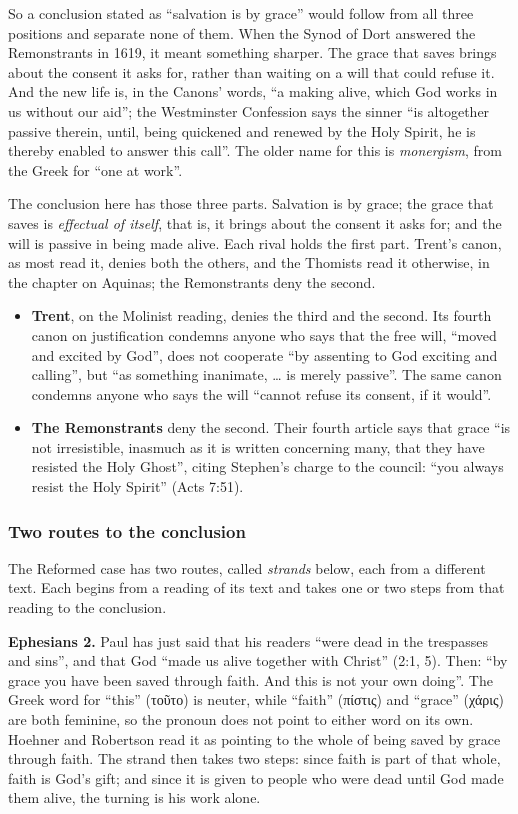 \documentclass[11pt]{article}
\begin{document}
So a conclusion stated as “salvation is by grace” would follow from all three positions and separate none of them. When the Synod of Dort answered the Remonstrants in 1619, it meant something sharper. The grace that saves brings about the consent it asks for, rather than waiting on a will that could refuse it. And the new life is, in the Canons’ words, “a making alive, which God works in us without our aid”; the Westminster Confession says the sinner “is altogether passive therein, until, being quickened and renewed by the Holy Spirit, he is thereby enabled to answer this call”. The older name for this is \emph{monergism}, from the Greek for “one at work”.

The conclusion here has those three parts. Salvation is by grace; the grace that saves is \emph{effectual of itself}, that is, it brings about the consent it asks for; and the will is passive in being made alive. Each rival holds the first part. Trent’s canon, as most read it, denies both the others, and the Thomists read it otherwise, in the chapter on Aquinas; the Remonstrants deny the second.

\begin{itemize}
  \item \textbf{Trent}, on the Molinist reading, denies the third and the second. Its fourth canon on justification condemns anyone who says that the free will, “moved and excited by God”, does not cooperate “by assenting to God exciting and calling”, but “as something inanimate, … is merely passive”. The same canon condemns anyone who says the will “cannot refuse its consent, if it would”.
  \item \textbf{The Remonstrants} deny the second. Their fourth article says that grace “is not irresistible, inasmuch as it is written concerning many, that they have resisted the Holy Ghost”, citing Stephen’s charge to the council: “you always resist the Holy Spirit” (Acts 7:51).
\end{itemize}
\subsubsection*{Two routes to the conclusion}
The Reformed case has two routes, called \emph{strands} below, each from a different text. Each begins from a reading of its text and takes one or two steps from that reading to the conclusion.

\textbf{Ephesians 2.} Paul has just said that his readers “were dead in the trespasses and sins”, and that God “made us alive together with Christ” (2:1, 5). Then: “by grace you have been saved through faith. And this is not your own doing”. The Greek word for “this” (τοῦτο) is neuter, while “faith” (πίστις) and “grace” (χάρις) are both feminine, so the pronoun does not point to either word on its own. Hoehner and Robertson read it as pointing to the whole of being saved by grace through faith. The strand then takes two steps: since faith is part of that whole, faith is God’s gift; and since it is given to people who were dead until God made them alive, the turning is his work alone.
\end{document}
